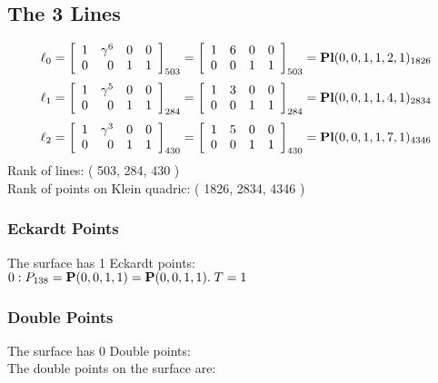 \documentclass{article}
\newcommand{\bP}{{\bf P}}
\begin{document}
{\subsection*{The 3 Lines}
$$
\ell_{0} = 
\left[
\begin{array}{*{4}{r}}
1 & \gamma^{6} & 0 & 0\\
0 & 0 & 1 & 1\\
\end{array}
\right]
_{503}
=
\left[
\begin{array}{*{4}c}
1  & 6  & 0  & 0\\
0  & 0  & 1  & 1\\
\end{array}
\right]_{503}
={\rm\bf Pl}(0,0,1,1,2,1 )_{1826}$$
$$
\ell_{1} = 
\left[
\begin{array}{*{4}{r}}
1 & \gamma^{5} & 0 & 0\\
0 & 0 & 1 & 1\\
\end{array}
\right]
_{284}
=
\left[
\begin{array}{*{4}c}
1  & 3  & 0  & 0\\
0  & 0  & 1  & 1\\
\end{array}
\right]_{284}
={\rm\bf Pl}(0,0,1,1,4,1 )_{2834}$$
$$
\ell_{2} = 
\left[
\begin{array}{*{4}{r}}
1 & \gamma^{3} & 0 & 0\\
0 & 0 & 1 & 1\\
\end{array}
\right]
_{430}
=
\left[
\begin{array}{*{4}c}
1  & 5  & 0  & 0\\
0  & 0  & 1  & 1\\
\end{array}
\right]_{430}
={\rm\bf Pl}(0,0,1,1,7,1 )_{4346}$$
Rank of lines: ( 503, 284, 430 )\\
Rank of points on Klein quadric: ( 1826, 2834, 4346 )\\
\subsubsection*{Eckardt Points}
The surface has 1 Eckardt points:\\
$0 : P_{138}=\bP(0, 0, 1, 1) = \bP(0, 0, 1, 1).\; T= 1$\\
\subsubsection*{Double Points}
The surface has 0 Double points:\\
The double points on the surface are:\\
\begin{multicols}{2}
\noindent
\end{multicols}
}
\end{document}
